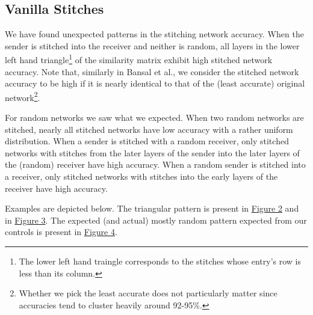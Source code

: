 \documentclass{article} %
\begin{document}
\subsection*{Vanilla Stitches}
We have found unexpected patterns in the stitching network accuracy.
When the sender is stitched into
the receiver and neither is random, all layers in the lower left hand triangle\footnote{
   The lower left hand traingle corresponds to the stitches whose entry's row is less than its column.
}
of the similarity matrix exhibit high stitched network accuracy. Note that, similarly in Bansal et al.,
we consider the stitched network accuracy to be high if it is nearly identical to that of the
(least accurate) original network\footnote{
   Whether we pick the least accurate does not particularly matter since accuracies tend to cluster heavily around 92-95\%.
}.

For random networks we saw what we expected.
When two random networks are stitched, nearly all stitched networks have low
accuracy with a rather uniform distribution. When
a sender is stitched with a random receiver, only stitched networks with stitches from the
later layers of the sender into the later layers of the (random)
receiver have high accuracy. When a random sender is stitched
into a receiver, only stitched networks with stitches into the early layers of the
receiver have high accuracy.

Examples are depicted below. The triangular pattern is present in \hyperref[Figure2]{Figure 2} and in \hyperref[Figure3]{Figure 3}.
The expected (and actual) mostly random pattern expected from our controls is present in \hyperref[Figure4]{Figure 4}.
\end{document}
